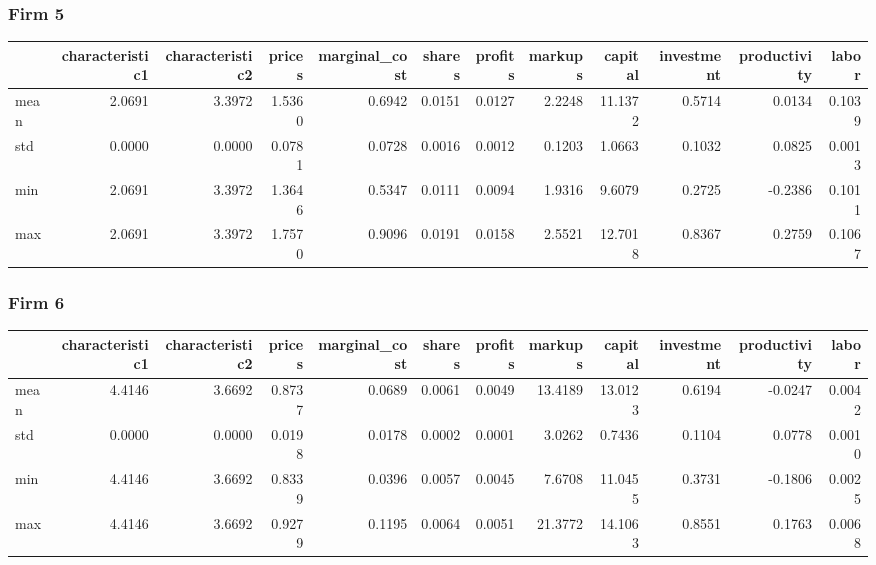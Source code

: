  \subsubsection*{Firm 5}
\begin{tabular}{lrrrrrrrrrrr}
\toprule
{} &  characteristic1 &  characteristic2 &  prices &  marginal\_cost &  shares &  profits &  markups &  capital &  investment &  productivity &  labor \\
\midrule
mean &           2.0691 &           3.3972 &  1.5360 &         0.6942 &  0.0151 &   0.0127 &   2.2248 &  11.1372 &      0.5714 &        0.0134 & 0.1039 \\
std  &           0.0000 &           0.0000 &  0.0781 &         0.0728 &  0.0016 &   0.0012 &   0.1203 &   1.0663 &      0.1032 &        0.0825 & 0.0013 \\
min  &           2.0691 &           3.3972 &  1.3646 &         0.5347 &  0.0111 &   0.0094 &   1.9316 &   9.6079 &      0.2725 &       -0.2386 & 0.1011 \\
max  &           2.0691 &           3.3972 &  1.7570 &         0.9096 &  0.0191 &   0.0158 &   2.5521 &  12.7018 &      0.8367 &        0.2759 & 0.1067 \\
\bottomrule
\end{tabular}


 \subsubsection*{Firm 6}
\begin{tabular}{lrrrrrrrrrrr}
\toprule
{} &  characteristic1 &  characteristic2 &  prices &  marginal\_cost &  shares &  profits &  markups &  capital &  investment &  productivity &  labor \\
\midrule
mean &           4.4146 &           3.6692 &  0.8737 &         0.0689 &  0.0061 &   0.0049 &  13.4189 &  13.0123 &      0.6194 &       -0.0247 & 0.0042 \\
std  &           0.0000 &           0.0000 &  0.0198 &         0.0178 &  0.0002 &   0.0001 &   3.0262 &   0.7436 &      0.1104 &        0.0778 & 0.0010 \\
min  &           4.4146 &           3.6692 &  0.8339 &         0.0396 &  0.0057 &   0.0045 &   7.6708 &  11.0455 &      0.3731 &       -0.1806 & 0.0025 \\
max  &           4.4146 &           3.6692 &  0.9279 &         0.1195 &  0.0064 &   0.0051 &  21.3772 &  14.1063 &      0.8551 &        0.1763 & 0.0068 \\
\bottomrule
\end{tabular}


